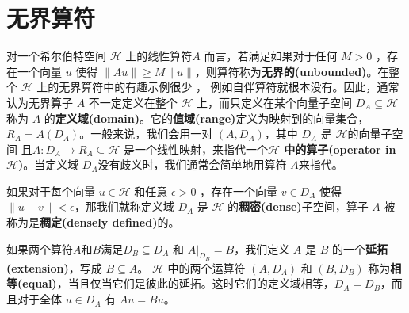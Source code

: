 \section{无界算符}\label{sec:13.6}
对一个希尔伯特空间 \(\mathcal{H}\) 上的线性算符\(A\) 而言，若满足如果对于任何 \(M>0\) ，存在一个向量 \(u\) 使得 \(\|A u \| \geq M\|u\|\)，则算符称为\textbf{无界的(unbounded)}。在整个 \(\mathcal{H}\) 上的无界算符中的有趣示例很少 ， 例如自伴算符就根本没有。因此，通常认为无界算子 \(A\) 不一定定义在整个 \(\mathcal{H}\) 上，而只定义在某个向量子空间 \(D_{A} \subseteq \mathcal{H} \) 称为 \(A\) 的\textbf{定义域(domain)}。它的\textbf{值域(range)}定义为映射到的向量集合，\(R_{A}=A\left(D_{A}\right)\)。一般来说，我们会用一对 \(\left(A, D_{A}\right)\)，其中 \(D_{A}\) 是 \(\mathcal{H}\)的向量子空间  且\(A: D_{A} \rightarrow R_{A} \subseteq \mathcal{H}\) 是一个线性映射，来指代一个\textbf{\(\mathcal{H}\) 中的算子(operator in \(\mathcal{H}\))}。当定义域 \(D_{A}\)没有歧义时，我们通常会简单地用算符 \(A\)来指代。

如果对于每个向量 \(u \in \mathcal{H}\) 和任意 \(\epsilon>0 \) ，存在一个向量 \(v \in D_{A}\) 使得 \(\|u-v\|<\epsilon\)，那我们就称定义域 \(D_{A}\) 是 \(\mathcal{H}\) 的\textbf{稠密(dense)}子空间，算子 \(A\) 被称为是\textbf{稠定(densely defined)}的。

如果两个算符\(A\)和\(B\)满足\(D_{B} \subseteq D_{A}\) 和 \(\left.A\right|_{D_{B}}=B\)，我们定义 \(A\) 是 \(B\) 的一个\textbf{延拓(extension)}，写成 \(B \subseteq A\)。 \(\mathcal{H}\) 中的两个运算符 \(\left(A, D_{A}\right)\) 和 \(\left(B, D_{B}\right)\) 称为\textbf{相等(equal)}，当且仅当它们是彼此的延拓。这时它们的定义域相等，\(D_{A}=D_{B}\)，而且对于全体 \(u \in D_{A}\) 有 \(A u=B u\)。

